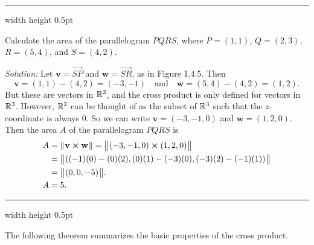 \hrule width \textwidth height 0.5pt
\begin{exmp}
 Calculate the area of the parallelogram $PQRS$, where $P = (1,1)$, $Q = (2,3)$, $R = (5,4)$, and
 $S = (4,2)$.\smallskip
 \piccaption[]{}
 \par\noindent\emph{Solution:} Let $\textbf{v} = \overrightarrow{SP}$ and $\textbf{w} = \overrightarrow{SR}$, as in
 Figure 1.4.5. 
 Then 
 \[\textbf{v} = (1,1) - (4,2) = (-3,-1)\quad\text{and}\quad\textbf{w} = (5,4) - (4,2) = (1,2).\] 
 But these are
 vectors in $\mathbb{R}^{2}$, and the cross product is only defined for vectors in $\mathbb{R}^{3}$. However, $\mathbb{R}^{2}$ can
 be thought of as the subset of $\mathbb{R}^{3}$ such that the $z$-coordinate is always $0$. So we can write
 $\textbf{v} = (-3,-1,0)$ and $\textbf{w} = (1,2,0)$. 
 Then the area $A$ of the parallelogram $PQRS$ is
 \begin{align*}
 A &= \lVert\mspace{1mu}\textbf{v} \bm{\times} \textbf{w}\mspace{1mu}\rVert = \bigl\lVert\mspace{1mu}(-3,-1,0) \bm{\times} (1,2,0)\mspace{1mu}\bigr\rVert\\
 &= \bigl\lVert\mspace{1mu}((-1)(0) - (0)(2), (0)(1) - (-3)(0), (-3)(2) - (-1)(1))\mspace{1mu}\bigr\rVert\\
 &= \bigl\lVert\mspace{1mu}(0,0, -5)\mspace{1mu}\bigr\rVert.\\
 A &= 5.
 \end{align*}
\end{exmp}

\hrule width \textwidth height 0.5pt
\medskip

The following theorem summarizes the basic properties of the cross product.

